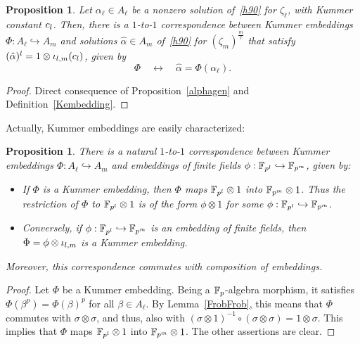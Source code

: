 \documentclass[sigconf]{acmart}
\newtheorem{proposition}[theorem]{Proposition}
\begin{document}
\begin{proposition}
\label{Phialpha}
Let $\alpha_\ell\in A_\ell$ be a nonzero solution of~\eqref{h90} for $\zeta_\ell$, with Kummer constant $c_l$.
Then, there is a $1$-to-$1$ correspondence between Kummer embeddings $\Phi:A_\ell\hookrightarrow A_m$ and solutions $\hat{\alpha}\in A_m$
of~\eqref{h90} for $(\zeta_m)^{\frac{m}{\ell}}$ that satisfy $(\hat{\alpha})^l=1\otimes{\iota_{{l},{m}}}(c_l)$,
given by \[ \Phi\quad\longleftrightarrow\quad\hat{\alpha}=\Phi(\alpha_\ell). \]
\end{proposition}
\begin{proof}
Direct consequence of Proposition~\ref{alphagen} and Definition~\ref{Kembedding}.
\end{proof}

Actually, Kummer embeddings are easily characterized:
\begin{proposition}
\label{Phiphi}
There is a natural $1$-to-$1$ correspondence between Kummer embeddings $\Phi:A_\ell\hookrightarrow A_m$
and embeddings of finite fields $\phi:\mathbb{F}_{p^l}\hookrightarrow\mathbb{F}_{p^m}$, given by:
\begin{itemize}
\item If $\Phi$ is a Kummer embedding, then $\Phi$ maps $\mathbb{F}_{p^l}\otimes1$ into $\mathbb{F}_{p^m}\otimes 1$.
Thus the restriction of $\Phi$ to $\mathbb{F}_{p^l}\otimes1$ is of the form $\phi\otimes1$ for some $\phi:\mathbb{F}_{p^l}\hookrightarrow\mathbb{F}_{p^m}$.
\item Conversely, if $\phi:\mathbb{F}_{p^l}\hookrightarrow\mathbb{F}_{p^m}$ is an embedding of finite fields, then $\Phi=\phi\otimes{\iota_{{l},{m}}}$
is a Kummer embedding.
\end{itemize}
Moreover, this correspondence commutes with composition of embeddings.
\end{proposition}
\begin{proof}
Let $\Phi$ be a Kummer embedding. Being a $\mathbb{F}_{p}$-algebra morphism, it satisfies $\Phi(\beta^p)=\Phi(\beta)^p$ for all $\beta\in A_\ell$.
By Lemma~\ref{FrobFrob}, this means that $\Phi$ commutes with $\sigma\otimes\sigma$, and thus,
also with $(\sigma\otimes 1)^{-1}\circ(\sigma\otimes\sigma)=1\otimes\sigma$.
This implies that $\Phi$ maps $\mathbb{F}_{p^l}\otimes1$ into $\mathbb{F}_{p^m}\otimes 1$.
The other assertions are clear.
\end{proof}
\end{document}
